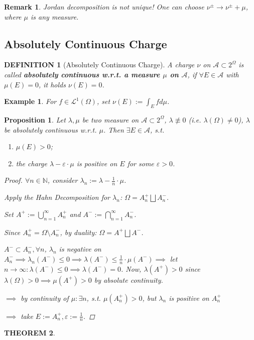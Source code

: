 \documentclass[12pt]{article}
\theoremstyle{blueplain}
\newtheorem{theorem}{THEOREM}[section]
\newtheorem{proposition}[theorem]{Proposition}
\theoremstyle{bluedef}
\newtheorem{definition}{DEFINITION}[section]
\theoremstyle{blueremark}
\newtheorem{remark}{Remark}[section]
\newtheorem{example}{Example}[section]
\newcommand{\N}{\mathbb{N}}
\newcommand{\eps}{\varepsilon}
\newcommand{\mL}{\mathcal{L}}
\numberwithin{equation}{section}
\begin{document}
\begin{remark}
  Jordan decomposition is not unique! One can choose $\nu^\pm \rightarrow \nu^\pm +\mu$, where $\mu$ is any measure.
\end{remark}

\clearpage

\subsection{Absolutely Continuous Charge}

\begin{definition}[Absolutely Continuous Charge]
  A charge $\nu$ on $\mathcal{A} \subset 2^\Omega$ is called \textbf{absolutely continuous w.r.t. a measure $\mu$ on $\mathcal{A}$}, if $\forall E \in \mathcal{A}$ with $\mu(E) = 0$, it holds $\nu(E) = 0$.
\end{definition}

\begin{example}
  For $f \in \mL^1(\Omega)$, set $\nu(E) := \int_E f d\mu$.
\end{example}

\begin{proposition}
  Let $\lambda, \mu$ be two measure on $\mathcal{A} \subset 2^\Omega$, $\lambda \not\equiv 0$ (i.e. $\lambda(\Omega) \neq 0$), $\lambda$ be absolutely continuous w.r.t. $\mu$. Then $\exists E \in \mathcal{A}$, s.t.
  \begin{enumerate}
    \item $\mu(E)>0$;
    \item the charge $\lambda - \eps \cdot \mu$ is positive on $E$ for some $\eps>0$.
  \end{enumerate}
  \begin{proof}
    $\forall n \in \N$, consider $\lambda_n := \lambda - \frac{1}{n} \cdot \mu$.

    Apply the Hahn Decomposition for $\lambda_n$:
    $\Omega = A^+_n \bigsqcup A^-_n$.

    Set $A^+ := \bigcup_{n=1}^\infty A_n^+$ and $A^- := \bigcap_{n=1}^\infty A_n^-$.

    Since $A^+_n = \Omega \setminus A_n^-$, by duality: $\Omega = A^+ \bigsqcup A^-$.

    $A^- \subset A^-_n, \forall n$, $\lambda_n$ is negative on $A_n^- \implies \lambda_n(A^-) \leq 0 \implies \lambda(A^-) \leq \frac{1}{n} \cdot \mu(A^-) \implies$ let $n \to \infty: \lambda(A^-) \leq 0 \implies \lambda(A^-) = 0$. Now, $\lambda(A^+) > 0$ since $\lambda(\Omega) >0 \implies \mu(A^+)>0$ by absolute continuity.

    $\implies$ by continuity of $\mu: \exists n$, s.t. $\mu(A^+_n)>0$, but $\lambda_n$ is positive on $A_n^+$

    $\implies$ take $E := A_n^+, \eps := \frac{1}{n}$.
  \end{proof}
\end{proposition}

\begin{theorem}

\end{theorem}



\onehalfspacing

\printindex
\end{document}
